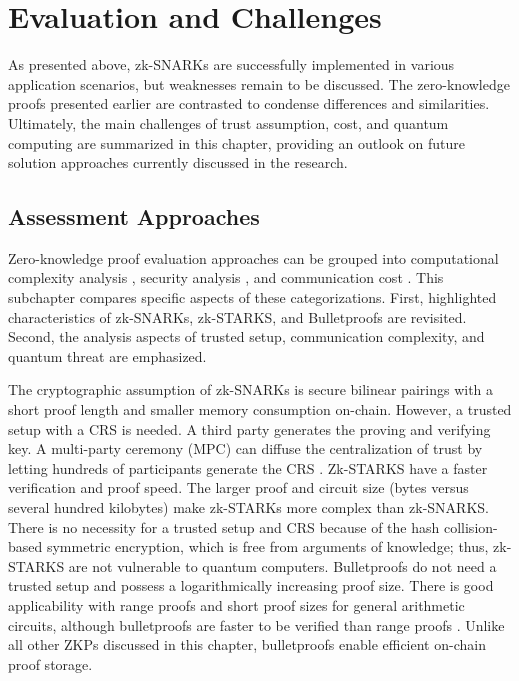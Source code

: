 \section{Evaluation and Challenges}
As presented above, zk-SNARKs are successfully implemented in various application scenarios, but weaknesses remain to be discussed. The zero-knowledge proofs presented earlier are contrasted to condense differences and similarities. Ultimately, the main challenges of trust assumption, cost, and quantum computing are summarized in this chapter, providing an outlook on future solution approaches currently discussed in the research.

\subsection{Assessment Approaches}
Zero-knowledge proof evaluation approaches can be grouped into computational complexity analysis \citep{LiuWangPengXing, SONIC10.1145/3319535.3339817, PipeZK}, security analysis \citep{Huangetal}, and communication cost \citep{ZHENG, liuetal, gongetal}. This subchapter compares specific aspects of these categorizations. First, highlighted characteristics of zk-SNARKs, zk-STARKS, and Bulletproofs are revisited. Second, the analysis aspects of trusted setup, communication complexity, and quantum threat are emphasized. 

The cryptographic assumption of zk-SNARKs is secure bilinear pairings with a short proof length and smaller memory consumption on-chain. However, a trusted setup with a CRS is needed. A third party generates the proving and verifying key. A multi-party ceremony (MPC) can diffuse the centralization of trust by letting hundreds of participants generate the CRS \citep{liuetal}. Zk-STARKS have a faster verification and proof speed. The larger proof and circuit size (bytes versus several hundred kilobytes) make zk-STARKs more complex than zk-SNARKS. There is no necessity for a trusted setup and CRS because of the hash collision-based symmetric encryption, which is free from arguments of knowledge; thus, zk-STARKS are not vulnerable to quantum computers. Bulletproofs do not need a trusted setup and possess a logarithmically increasing proof size. There is good applicability with range proofs and short proof sizes for general arithmetic circuits, although bulletproofs are faster to be verified than range proofs \citep{gongetal}. Unlike all other ZKPs discussed in this chapter, bulletproofs enable efficient on-chain proof storage. 

